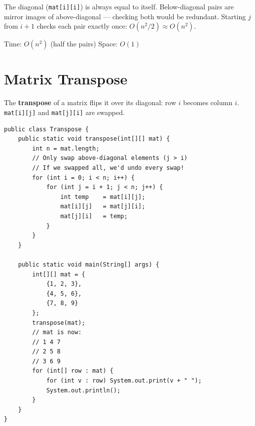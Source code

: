 \documentclass[12pt,a4paper,oneside]{book}
\begin{document}
\begin{tipbox}
The diagonal (\texttt{mat[i][i]}) is always equal to itself. Below-diagonal pairs are mirror images of above-diagonal --- checking both would be redundant. Starting $j$ from $i+1$ checks each pair exactly once: $O(n^2/2) \approx O(n^2)$.
\end{tipbox}

\begin{complexity}
Time: $O(n^2)$ (half the pairs) \quad Space: $O(1)$
\end{complexity}

\section{Matrix Transpose}

The \textbf{transpose} of a matrix flips it over its diagonal: row $i$ becomes column $i$. \texttt{mat[i][j]} and \texttt{mat[j][i]} are swapped.

\begin{center}
\end{center}

\begin{lstlisting}[caption={Matrix Transpose --- in-place, swap upper triangle only}]
public class Transpose {
    public static void transpose(int[][] mat) {
        int n = mat.length;
        // Only swap above-diagonal elements (j > i)
        // If we swapped all, we'd undo every swap!
        for (int i = 0; i < n; i++) {
            for (int j = i + 1; j < n; j++) {
                int temp    = mat[i][j];
                mat[i][j]   = mat[j][i];
                mat[j][i]   = temp;
            }
        }
    }

    public static void main(String[] args) {
        int[][] mat = {
            {1, 2, 3},
            {4, 5, 6},
            {7, 8, 9}
        };
        transpose(mat);
        // mat is now:
        // 1 4 7
        // 2 5 8
        // 3 6 9
        for (int[] row : mat) {
            for (int v : row) System.out.print(v + " ");
            System.out.println();
        }
    }
}
\end{lstlisting}
\end{document}
